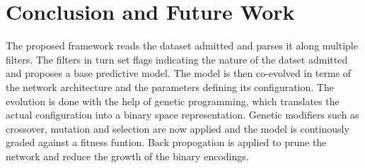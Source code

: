 \documentclass[conference]{IEEEtran}
\begin{document}
\section{Conclusion and Future Work}

The proposed framework reads the dataset admitted and parses it along multiple filters. The filters in turn set flags indicating the nature of the datset admitted and proposes a base predictive model. The model is then co-evolved in terms of the network architecture and the parameters defining its configuration. The evolution is done with the help of genetic programming, which translates the actual configuration into a binary space representation. Genetic modifiers such as crossover, mutation and selection are now applied and the model is continously graded against a fitness funtion. Back propogation is applied to prune the network and reduce the growth of the binary encodings. 
\end{document}
